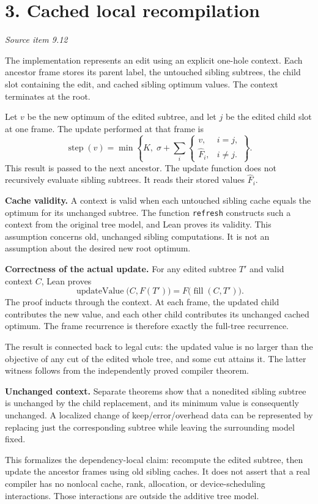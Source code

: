 \documentclass[11pt]{article}
\newcommand{\code}[1]{\texttt{\small #1}}
\newcommand{\pageheading}[2]{\section*{\color{ink}#1}\textit{#2}\par}
\begin{document}
\newpage
\pageheading{3. Cached local recompilation}{Source item 9.12}
The implementation represents an edit using an explicit one-hole context. Each ancestor frame stores its parent label, the untouched sibling subtrees, the child slot containing the edit, and cached sibling optimum values. The context terminates at the root.

Let $v$ be the new optimum of the edited subtree, and let $j$ be the edited child slot at one frame. The update performed at that frame is
\[
\boxed{
\operatorname{step}(v)=
\min\left\{K,\;\sigma+
\sum_i\begin{cases}
v,&i=j,\\
\widehat F_i,&i\ne j.
\end{cases}\right\}.
}
\]
This result is passed to the next ancestor. The update function does not recursively evaluate sibling subtrees. It reads their stored values $\widehat F_i$.

\textbf{Cache validity.} A context is valid when each untouched sibling cache equals the optimum for its unchanged subtree. The function \code{refresh} constructs such a context from the original tree model, and Lean proves its validity. This assumption concerns old, unchanged sibling computations. It is not an assumption about the desired new root optimum.

\textbf{Correctness of the actual update.} For any edited subtree $T'$ and valid context $C$, Lean proves
\[
\operatorname{updateValue}\bigl(C,F(T')\bigr)=F\bigl(\operatorname{fill}(C,T')\bigr).
\]
The proof inducts through the context. At each frame, the updated child contributes the new value, and each other child contributes its unchanged cached optimum. The frame recurrence is therefore exactly the full-tree recurrence.

The result is connected back to legal cuts: the updated value is no larger than the objective of any cut of the edited whole tree, and some cut attains it. The latter witness follows from the independently proved compiler theorem.

\textbf{Unchanged context.} Separate theorems show that a nonedited sibling subtree is unchanged by the child replacement, and its minimum value is consequently unchanged. A localized change of keep/error/overhead data can be represented by replacing just the corresponding subtree while leaving the surrounding model fixed.

This formalizes the dependency-local claim: recompute the edited subtree, then update the ancestor frames using old sibling caches. It does not assert that a real compiler has no nonlocal cache, rank, allocation, or device-scheduling interactions. Those interactions are outside the additive tree model.
\end{document}
